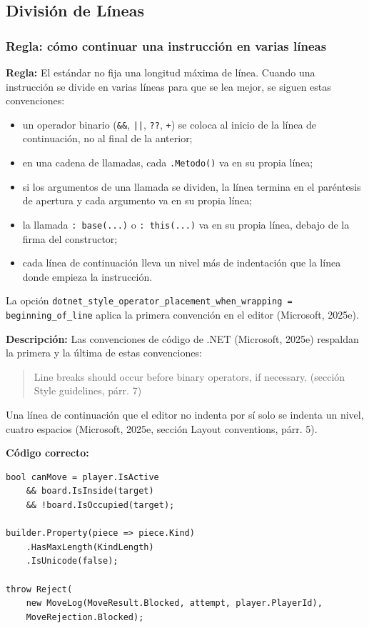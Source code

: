 \subsection{División de Líneas}

\subsubsection{Regla: cómo continuar una instrucción en varias líneas}

\textbf{Regla:} El estándar no fija una longitud máxima de línea. Cuando una instrucción se divide en varias líneas para que se lea mejor, se siguen estas convenciones:

\begin{itemize}
  \item un operador binario (\texttt{\&\&}, \texttt{||}, \texttt{??}, \texttt{+}) se coloca al inicio de la línea de continuación, no al final de la anterior;
  \item en una cadena de llamadas, cada \texttt{.Metodo()} va en su propia línea;
  \item si los argumentos de una llamada se dividen, la línea termina en el paréntesis de apertura y cada argumento va en su propia línea;
  \item la llamada \texttt{: base(...)} o \texttt{: this(...)} va en su propia línea, debajo de la firma del constructor;
  \item cada línea de continuación lleva un nivel más de indentación que la línea donde empieza la instrucción.
\end{itemize}

La opción \texttt{dotnet\_style\_operator\_placement\_when\_wrapping = beginning\_of\_line} aplica la primera convención en el editor (Microsoft, 2025e).

\textbf{Descripción:} Las convenciones de código de .NET (Microsoft, 2025e) respaldan la primera y la última de estas convenciones:
\begin{quote}
Line breaks should occur before binary operators, if necessary. (sección Style guidelines, párr. 7)
\end{quote}
\noindent Una línea de continuación que el editor no indenta por sí solo se indenta un nivel, cuatro espacios (Microsoft, 2025e, sección Layout conventions, párr. 5).

\textbf{Código correcto:}
\begin{lstlisting}[style=csharpstyle]
bool canMove = player.IsActive
    && board.IsInside(target)
    && !board.IsOccupied(target);

builder.Property(piece => piece.Kind)
    .HasMaxLength(KindLength)
    .IsUnicode(false);

throw Reject(
    new MoveLog(MoveResult.Blocked, attempt, player.PlayerId),
    MoveRejection.Blocked);
\end{lstlisting}

